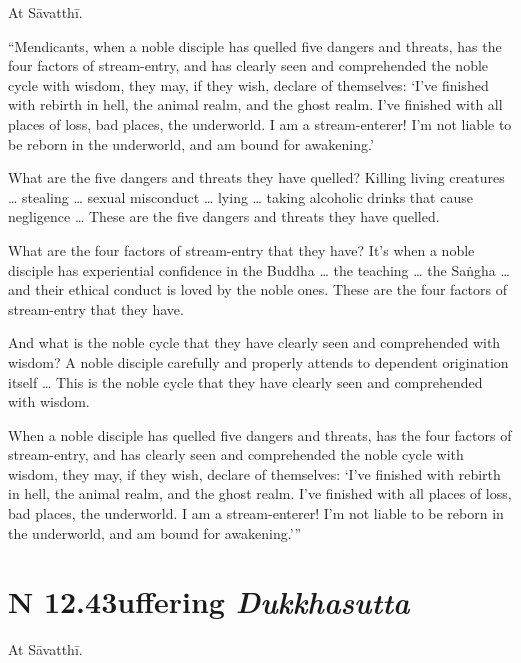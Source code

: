 \documentclass[12pt,openany]{book}%
\newcommand*{\suttatitleacronym}[1]{\smaller[2]{#1}\vspace*{.3em}}
\newcommand*{\suttatitletranslation}[1]{\linebreak{#1}}
\newcommand*{\suttatitleroot}[1]{\linebreak\smaller[2]\itshape{#1}}
\newcommand*{\tocacronym}[1]{\hspace*{-3.3em}{#1}\quad}
\newcommand*{\toctranslation}[1]{#1}
\newcommand*{\tocroot}[1]{(\textit{#1})}
\begin{document}
At \textsanskrit{Sāvatthī}. 

“Mendicants, when a noble disciple has quelled five dangers and threats, has the four factors of stream-entry, and has clearly seen and comprehended the noble cycle with wisdom, they may, if they wish, declare of themselves: ‘I’ve finished with rebirth in hell, the animal realm, and the ghost realm. I’ve finished with all places of loss, bad places, the underworld. I am a stream-enterer! I’m not liable to be reborn in the underworld, and am bound for awakening.’ 

What are the five dangers and threats they have quelled? Killing living creatures … stealing … sexual misconduct … lying … taking alcoholic drinks that cause negligence … These are the five dangers and threats they have quelled. 

What are the four factors of stream-entry that they have? It’s when a noble disciple has experiential confidence in the Buddha … the teaching … the \textsanskrit{Saṅgha} … and their ethical conduct is loved by the noble ones. These are the four factors of stream-entry that they have. 

And what is the noble cycle that they have clearly seen and comprehended with wisdom? A noble disciple carefully and properly attends to dependent origination itself … This is the noble cycle that they have clearly seen and comprehended with wisdom. 

When a noble disciple has quelled five dangers and threats, has the four factors of stream-entry, and has clearly seen and comprehended the noble cycle with wisdom, they may, if they wish, declare of themselves: ‘I’ve finished with rebirth in hell, the animal realm, and the ghost realm. I’ve finished with all places of loss, bad places, the underworld. I am a stream-enterer! I’m not liable to be reborn in the underworld, and am bound for awakening.’” 

%
\section*{{\suttatitleacronym SN 12.43}{\suttatitletranslation Suffering }{\suttatitleroot Dukkhasutta}}
\addcontentsline{toc}{section}{\tocacronym{SN 12.43} \toctranslation{Suffering } \tocroot{Dukkhasutta}}

At \textsanskrit{Sāvatthī}. 
\end{document}
